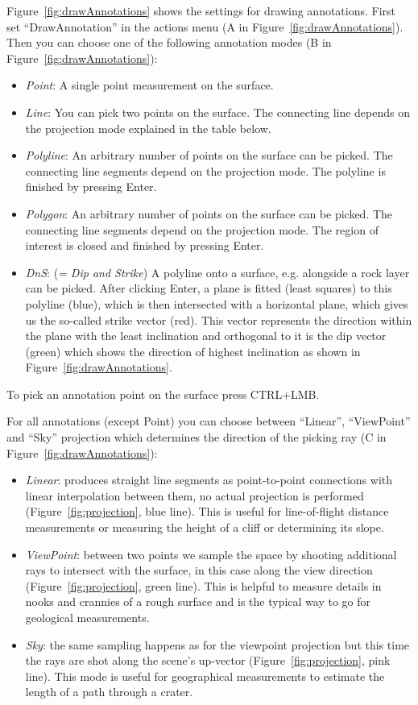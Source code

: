 Figure~\ref{fig:drawAnnotations} shows the settings for drawing annotations. First set ``DrawAnnotation'' in the actions menu (A in Figure~\ref{fig:drawAnnotations}). Then you can choose one of the following annotation modes (B in Figure~\ref{fig:drawAnnotations}):
\begin{itemize}
	\item \textit{Point}: A single point measurement on the surface.
	\item \textit{Line}: You can pick two points on the surface. The connecting line depends on the projection mode explained in the table below.
	\item \textit{Polyline}: An arbitrary number of points on the surface can be picked. The connecting line segments depend on the projection mode. The polyline is finished by pressing Enter.
	\item \textit{Polygon}: An arbitrary number of points on the surface can be picked. The connecting line segments depend on the projection mode. The region of interest is closed and finished by pressing Enter.
	\item \textit{DnS}: (\textit{= Dip and Strike}) A polyline onto a surface, e.g. alongside a rock layer can be picked. After clicking Enter, a plane is fitted (least squares) to this polyline (blue), which is then intersected with a horizontal plane, which gives us the so-called strike vector (red). This vector represents the direction within the plane with the least inclination and orthogonal to it is the dip vector (green) which shows the direction of highest inclination as shown in Figure~\ref{fig:drawAnnotations}.
\end{itemize}
To pick an annotation point on the surface press CTRL+LMB.

For all annotations (except Point) you can choose between ``Linear'', ``ViewPoint'' and ``Sky'' projection which determines the direction of the picking ray (C in Figure~\ref{fig:drawAnnotations}):
\begin{itemize}
	\item \textit{Linear}: produces straight line segments as point-to-point connections with linear interpolation between them, no actual projection is performed (Figure~\ref{fig:projection}, blue line). This is useful for line-of-flight distance measurements or measuring the height of a cliff or determining its slope.
	\item \textit{ViewPoint}: between two points we sample the space by shooting additional rays to intersect with the surface, in this case along the view direction (Figure~\ref{fig:projection}, green line). This is helpful to measure details in nooks and crannies of a rough surface and is the typical way to go for geological measurements.
	\item \textit{Sky}: the same sampling happens as for the viewpoint projection but this time the rays are shot along the scene's up-vector (Figure~\ref{fig:projection}, pink line). This mode is useful for geographical measurements to estimate the length of a path through a crater.
\end{itemize}

